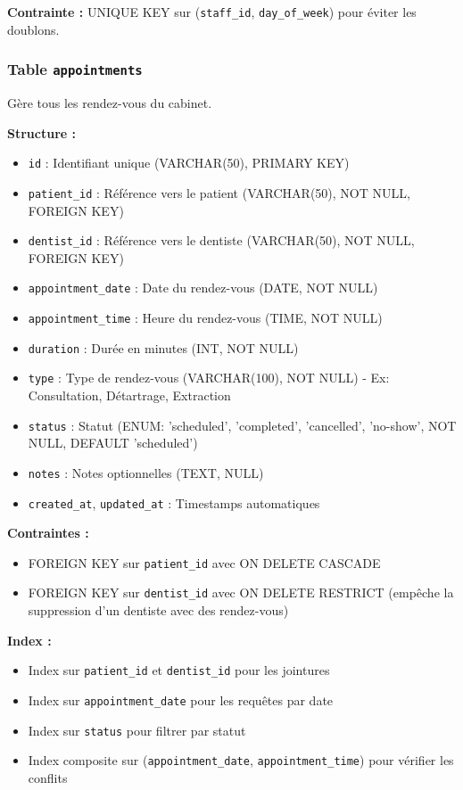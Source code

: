 \documentclass[12pt,a4paper]{report}
\begin{document}
\textbf{Contrainte :} UNIQUE KEY sur (\texttt{staff\_id}, \texttt{day\_of\_week}) pour éviter les doublons.

\subsubsection{Table \texttt{appointments}}

Gère tous les rendez-vous du cabinet.

\textbf{Structure :}
\begin{itemize}
    \item \texttt{id} : Identifiant unique (VARCHAR(50), PRIMARY KEY)
    \item \texttt{patient\_id} : Référence vers le patient (VARCHAR(50), NOT NULL, FOREIGN KEY)
    \item \texttt{dentist\_id} : Référence vers le dentiste (VARCHAR(50), NOT NULL, FOREIGN KEY)
    \item \texttt{appointment\_date} : Date du rendez-vous (DATE, NOT NULL)
    \item \texttt{appointment\_time} : Heure du rendez-vous (TIME, NOT NULL)
    \item \texttt{duration} : Durée en minutes (INT, NOT NULL)
    \item \texttt{type} : Type de rendez-vous (VARCHAR(100), NOT NULL) - Ex: Consultation, Détartrage, Extraction
    \item \texttt{status} : Statut (ENUM: 'scheduled', 'completed', 'cancelled', 'no-show', NOT NULL, DEFAULT 'scheduled')
    \item \texttt{notes} : Notes optionnelles (TEXT, NULL)
    \item \texttt{created\_at}, \texttt{updated\_at} : Timestamps automatiques
\end{itemize}

\textbf{Contraintes :}
\begin{itemize}
    \item FOREIGN KEY sur \texttt{patient\_id} avec ON DELETE CASCADE
    \item FOREIGN KEY sur \texttt{dentist\_id} avec ON DELETE RESTRICT (empêche la suppression d'un dentiste avec des rendez-vous)
\end{itemize}

\textbf{Index :}
\begin{itemize}
    \item Index sur \texttt{patient\_id} et \texttt{dentist\_id} pour les jointures
    \item Index sur \texttt{appointment\_date} pour les requêtes par date
    \item Index sur \texttt{status} pour filtrer par statut
    \item Index composite sur (\texttt{appointment\_date}, \texttt{appointment\_time}) pour vérifier les conflits
\end{itemize}
\end{document}
